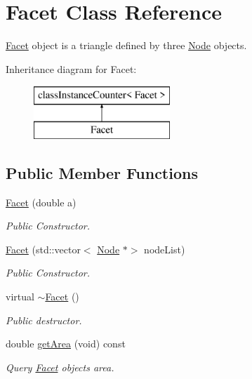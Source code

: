 \hypertarget{class_facet}{}\section{Facet Class Reference}
\label{class_facet}


\mbox{\hyperlink{class_facet}{Facet}} object is a triangle defined by three \mbox{\hyperlink{class_node}{Node}} objects.  


Inheritance diagram for Facet\+:\begin{figure}[H]
\begin{center}
\leavevmode
\includegraphics[height=2.000000cm]{class_facet}
\end{center}
\end{figure}
\subsection*{Public Member Functions}
\begin{DoxyCompactItemize}
\item 
\mbox{\hyperlink{class_facet_acfcdcc63ac32fc2a1d0378a899441bbc}{Facet}} (double a)
\begin{DoxyCompactList}\small\item\em Public Constructor. \end{DoxyCompactList}\item 
\mbox{\hyperlink{class_facet_aaecf4566bbdbfb3904d9c3ce6f7c41cf}{Facet}} (std\+::vector$<$ \mbox{\hyperlink{class_node}{Node}} $\ast$$>$ node\+List)
\begin{DoxyCompactList}\small\item\em Public Constructor. \end{DoxyCompactList}\item 
virtual \mbox{\hyperlink{class_facet_af40042b9ad6c5a03127034f9d1c1e786}{$\sim$\+Facet}} ()
\begin{DoxyCompactList}\small\item\em Public destructor. \end{DoxyCompactList}\item 
double \mbox{\hyperlink{class_facet_a90036d7bb3e52b57ac0d48f6bc1e019c}{get\+Area}} (void) const
\begin{DoxyCompactList}\small\item\em Query \mbox{\hyperlink{class_facet}{Facet}} object\textquotesingle{}s area. \end{DoxyCompactList}\end{DoxyCompactItemize}
